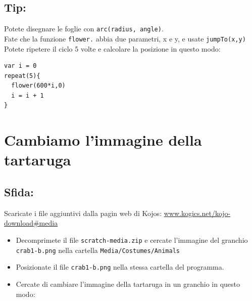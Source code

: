 \section*{\color{OliveGreen}Tip:}
Potete disegnare le foglie con \lstinline{arc(radius, angle)}. \\
Fate che la funzione \lstinline{flower.} abbia due parametri, x e y, e usate \lstinline{jumpTo(x,y)}\\
Potete ripetere il ciclo 5 volte e calcolare la posizione in questo modo:

\begin{lstlisting}[basicstyle={\ttfamily\fontsize{18}{22}\selectfont},numbers=none]
var i = 0          
repeat(5){
  flower(600*i,0)
  i = i + 1        
}
\end{lstlisting}
        
\chapter{Cambiamo l'immagine della tartaruga}\section*{\color{BrickRed}Sfida:}
Scaricate i file aggiuntivi dalla pagin web di Kojos:
\href{http://www.kogics.net/kojo-download#media}{www.kogics.net/kojo-download\#media}


\begin{itemize}

\item {Decomprimete il file \lstinline{scratch-media.zip} e cercate l'immagine del granchio \lstinline{crab1-b.png} nella cartella \lstinline{Media/Costumes/Animals}}
\item {Posizionate il file \lstinline{crab1-b.png} nella stessa cartella del programma.}
\item {Cercate di cambiare l'immagine della tartaruga in un granchio in questo modo:}

\end{itemize}



  

